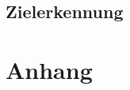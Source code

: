 \documentclass{scrartcl}
\begin{document}
\subsection{Zielerkennung}




  
\appendix 
\section{Anhang}

 

 
 
\end{document}
